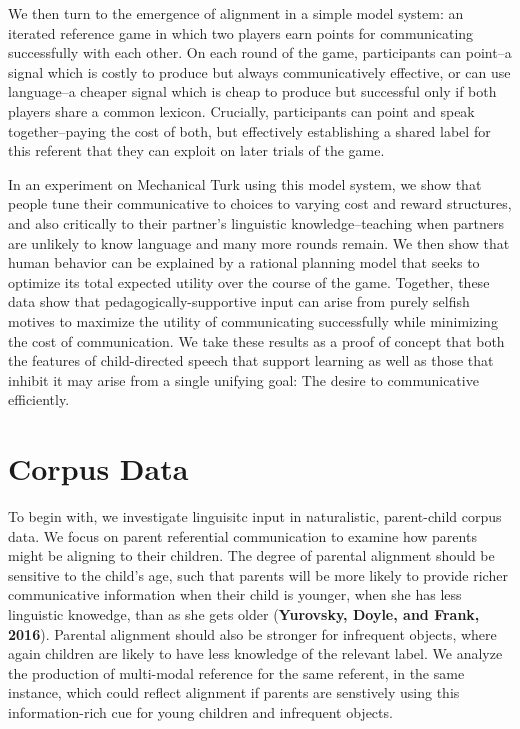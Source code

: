 \documentclass[10pt, letterpaper]{article}
\begin{document}
We then turn to the emergence of alignment in a simple model system: an
iterated reference game in which two players earn points for
communicating successfully with each other. On each round of the game,
participants can point--a signal which is costly to produce but always
communicatively effective, or can use language--a cheaper signal which
is cheap to produce but successful only if both players share a common
lexicon. Crucially, participants can point and speak together--paying
the cost of both, but effectively establishing a shared label for this
referent that they can exploit on later trials of the game.

In an experiment on Mechanical Turk using this model system, we show
that people tune their communicative to choices to varying cost and
reward structures, and also critically to their partner's linguistic
knowledge--teaching when partners are unlikely to know language and many
more rounds remain. We then show that human behavior can be explained by
a rational planning model that seeks to optimize its total expected
utility over the course of the game. Together, these data show that
pedagogically-supportive input can arise from purely selfish motives to
maximize the utility of communicating successfully while minimizing the
cost of communication. We take these results as a proof of concept that
both the features of child-directed speech that support learning as well
as those that inhibit it may arise from a single unifying goal: The
desire to communicative efficiently.

\section{Corpus Data}\label{corpus-data}

To begin with, we investigate linguisitc input in naturalistic,
parent-child corpus data. We focus on parent referential communication
to examine how parents might be aligning to their children. The degree
of parental alignment should be sensitive to the child's age, such that
parents will be more likely to provide richer communicative information
when their child is younger, when she has less linguistic knowedge, than
as she gets older (\textbf{Yurovsky, Doyle, and Frank, 2016}). Parental
alignment should also be stronger for infrequent objects, where again
children are likely to have less knowledge of the relevant label. We
analyze the production of multi-modal reference for the same referent,
in the same instance, which could reflect alignment if parents are
senstively using this information-rich cue for young children and
infrequent objects.
\end{document}

